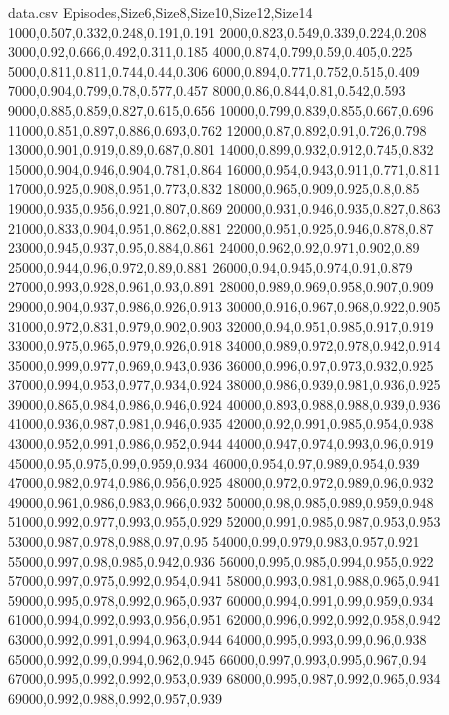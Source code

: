 \documentclass[pdflatex,sn-mathphys-num]{sn-jnl}%
\theoremstyle{thmstyleone}%
\theoremstyle{thmstyletwo}%
\theoremstyle{thmstylethree}%
\begin{document}
\begin{filecontents*}{data.csv}
Episodes,Size6,Size8,Size10,Size12,Size14
1000,0.507,0.332,0.248,0.191,0.191
2000,0.823,0.549,0.339,0.224,0.208
3000,0.92,0.666,0.492,0.311,0.185
4000,0.874,0.799,0.59,0.405,0.225
5000,0.811,0.811,0.744,0.44,0.306
6000,0.894,0.771,0.752,0.515,0.409
7000,0.904,0.799,0.78,0.577,0.457
8000,0.86,0.844,0.81,0.542,0.593
9000,0.885,0.859,0.827,0.615,0.656
10000,0.799,0.839,0.855,0.667,0.696
11000,0.851,0.897,0.886,0.693,0.762
12000,0.87,0.892,0.91,0.726,0.798
13000,0.901,0.919,0.89,0.687,0.801
14000,0.899,0.932,0.912,0.745,0.832
15000,0.904,0.946,0.904,0.781,0.864
16000,0.954,0.943,0.911,0.771,0.811
17000,0.925,0.908,0.951,0.773,0.832
18000,0.965,0.909,0.925,0.8,0.85
19000,0.935,0.956,0.921,0.807,0.869
20000,0.931,0.946,0.935,0.827,0.863
21000,0.833,0.904,0.951,0.862,0.881
22000,0.951,0.925,0.946,0.878,0.87
23000,0.945,0.937,0.95,0.884,0.861
24000,0.962,0.92,0.971,0.902,0.89
25000,0.944,0.96,0.972,0.89,0.881
26000,0.94,0.945,0.974,0.91,0.879
27000,0.993,0.928,0.961,0.93,0.891
28000,0.989,0.969,0.958,0.907,0.909
29000,0.904,0.937,0.986,0.926,0.913
30000,0.916,0.967,0.968,0.922,0.905
31000,0.972,0.831,0.979,0.902,0.903
32000,0.94,0.951,0.985,0.917,0.919
33000,0.975,0.965,0.979,0.926,0.918
34000,0.989,0.972,0.978,0.942,0.914
35000,0.999,0.977,0.969,0.943,0.936
36000,0.996,0.97,0.973,0.932,0.925
37000,0.994,0.953,0.977,0.934,0.924
38000,0.986,0.939,0.981,0.936,0.925
39000,0.865,0.984,0.986,0.946,0.924
40000,0.893,0.988,0.988,0.939,0.936
41000,0.936,0.987,0.981,0.946,0.935
42000,0.92,0.991,0.985,0.954,0.938
43000,0.952,0.991,0.986,0.952,0.944
44000,0.947,0.974,0.993,0.96,0.919
45000,0.95,0.975,0.99,0.959,0.934
46000,0.954,0.97,0.989,0.954,0.939
47000,0.982,0.974,0.986,0.956,0.925
48000,0.972,0.972,0.989,0.96,0.932
49000,0.961,0.986,0.983,0.966,0.932
50000,0.98,0.985,0.989,0.959,0.948
51000,0.992,0.977,0.993,0.955,0.929
52000,0.991,0.985,0.987,0.953,0.953
53000,0.987,0.978,0.988,0.97,0.95
54000,0.99,0.979,0.983,0.957,0.921
55000,0.997,0.98,0.985,0.942,0.936
56000,0.995,0.985,0.994,0.955,0.922
57000,0.997,0.975,0.992,0.954,0.941
58000,0.993,0.981,0.988,0.965,0.941
59000,0.995,0.978,0.992,0.965,0.937
60000,0.994,0.991,0.99,0.959,0.934
61000,0.994,0.992,0.993,0.956,0.951
62000,0.996,0.992,0.992,0.958,0.942
63000,0.992,0.991,0.994,0.963,0.944
64000,0.995,0.993,0.99,0.96,0.938
65000,0.992,0.99,0.994,0.962,0.945
66000,0.997,0.993,0.995,0.967,0.94
67000,0.995,0.992,0.992,0.953,0.939
68000,0.995,0.987,0.992,0.965,0.934
69000,0.992,0.988,0.992,0.957,0.939

\end{filecontents*}
\end{document}
